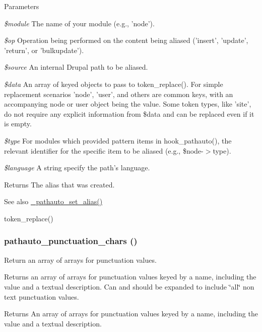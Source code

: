 \begin{DoxyParams}{Parameters}
\item[{\em \$module}]The name of your module (e.g., 'node'). \item[{\em \$op}]Operation being performed on the content being aliased ('insert', 'update', 'return', or 'bulkupdate'). \item[{\em \$source}]An internal Drupal path to be aliased. \item[{\em \$data}]An array of keyed objects to pass to token\_\-replace(). For simple replacement scenarios 'node', 'user', and others are common keys, with an accompanying node or user object being the value. Some token types, like 'site', do not require any explicit information from \$data and can be replaced even if it is empty. \item[{\em \$type}]For modules which provided pattern items in hook\_\-pathauto(), the relevant identifier for the specific item to be aliased (e.g., \$node-\/$>$type). \item[{\em \$language}]A string specify the path's language. \end{DoxyParams}
\begin{DoxyReturn}{Returns}
The alias that was created.
\end{DoxyReturn}
\begin{DoxySeeAlso}{See also}
\hyperlink{pathauto_8inc_a954e5a5c442176c91e5a8fead004f9f1}{\_\-pathauto\_\-set\_\-alias()} 

token\_\-replace() 
\end{DoxySeeAlso}
\hypertarget{pathauto_8inc_a939a77c5a4177051307d62aad585b74e}{
\subsubsection[{pathauto\_\-punctuation\_\-chars}]{\setlength{\rightskip}{0pt plus 5cm}pathauto\_\-punctuation\_\-chars ()}}
\label{pathauto_8inc_a939a77c5a4177051307d62aad585b74e}
Return an array of arrays for punctuation values.

Returns an array of arrays for punctuation values keyed by a name, including the value and a textual description. Can and should be expanded to include \char`\"{}all\char`\"{} non text punctuation values.

\begin{DoxyReturn}{Returns}
An array of arrays for punctuation values keyed by a name, including the value and a textual description. 
\end{DoxyReturn}
